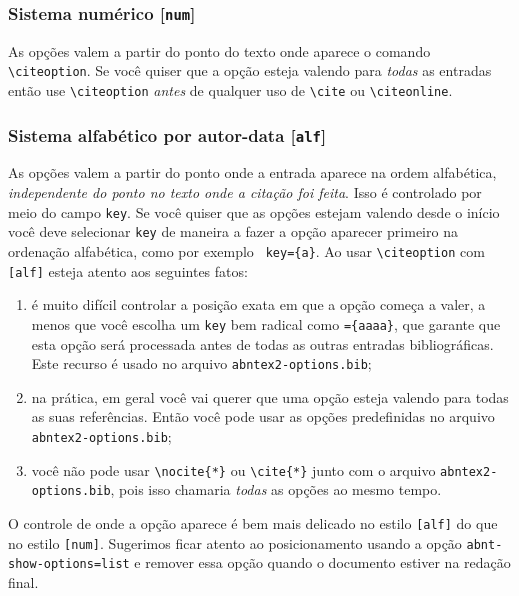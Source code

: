 \documentclass[a4paper]{ltxdoc}
\begin{document}
\subsubsection{Sistema numérico [{\tt num}]}\label{section-quando-vale-num}

As opções valem a partir do ponto do texto onde aparece o comando
\verb+\citeoption+. Se você quiser que a opção esteja valendo para \emph{todas}
as entradas então use \verb+\citeoption+ \emph{antes} de qualquer uso de
\verb+\cite+ ou \verb+\citeonline+.

\subsubsection{Sistema alfabético por autor-data [{\tt alf}]}
\label{section-quando-vale-alf}

As opções valem a partir do ponto onde a entrada aparece na ordem alfabética,
\emph{independente do ponto no texto onde a citação foi feita}. Isso é
controlado por meio do campo {\tt key}. Se você quiser que as opções estejam
valendo desde o início você deve selecionar {\tt key} de maneira a fazer a
opção aparecer primeiro na ordenação alfabética, como por exemplo {\tt
key=\{a\}}. Ao usar \verb+\citeoption+ com {\tt [alf]} esteja atento aos
seguintes fatos:

\begin{enumerate}
\item é muito difícil controlar a posição exata em que a opção
      começa a valer, a menos que você escolha um {\tt key} bem
      radical como {\tt=\{aaaa\}}, que garante que esta opção será
      processada antes de todas as outras entradas bibliográficas.
      Este recurso é usado no arquivo {\tt abntex2-options.bib};
\item na prática, em geral você vai querer que uma opção esteja
      valendo para todas as suas referências. Então você pode usar
      as opções predefinidas no arquivo {\tt abntex2-options.bib};
\item você não pode usar \verb+\nocite{*}+ ou \verb+\cite{*}+
      junto com o arquivo
      {\tt abntex2-options.bib}, pois isso chamaria \emph{todas} as
      opções ao mesmo tempo.
\end{enumerate}

O controle de onde a opção aparece é bem mais delicado no estilo {\tt [alf]}
do que no estilo {\tt [num]}. Sugerimos ficar atento ao posicionamento
usando a opção {\tt abnt-show-options=list} e remover essa opção quando o
documento estiver na redação final.
\end{document}
